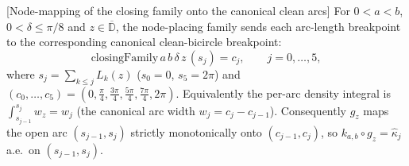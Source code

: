 \begin{lemma}

[Node-mapping of the closing family onto the canonical clean arcs]
  \label{lem:closing_family_nodes}
  For $0<a<b$, $0<\delta\le\pi/8$ and $z\in\overline{\mathbb{D}}$, the node-placing
  family sends each arc-length breakpoint to the corresponding canonical
  clean-bicircle breakpoint:
  \[
    \mathrm{closingFamily}\,a\,b\,\delta\,z\,(s_j)=c_j,\qquad j=0,\dots,5,
  \]
  where $s_j=\sum_{k\le j}L_k(z)$ ($s_0=0$, $s_5=2\pi$) and
  $(c_0,\dots,c_5)=(0,\tfrac{\pi}{4},\tfrac{3\pi}{4},\tfrac{5\pi}{4},\tfrac{7\pi}{4},2\pi)$.
  Equivalently the per-arc density integral is
  $\int_{s_{j-1}}^{s_j}w_z=w_j$ (the canonical arc width
  $w_j=c_j-c_{j-1}$). Consequently $g_z$ maps the open arc $(s_{j-1},s_j)$
  strictly monotonically onto $(c_{j-1},c_j)$, so $k_{a,b}\circ g_z=\hat\kappa_j$
  a.e.\ on $(s_{j-1},s_j)$.
\end{lemma}
